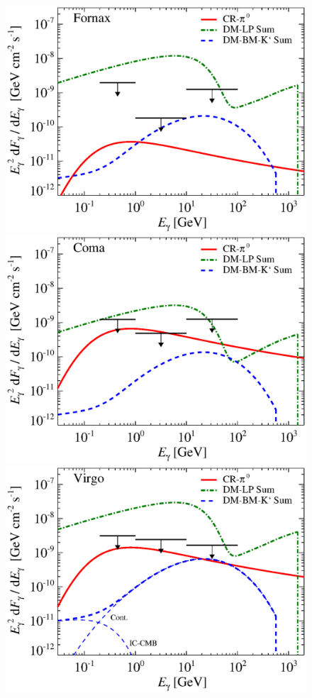 \documentclass[10pt,aps,pra,reprint,amsmath,amsfonts,amssymb,showpacs,nofootinbib,floatfix]{revtex4-1}
\def\del#1{{}}
\newcommand{\rmn}{\mathrm}
\newcommand{\sub}{\rmn{sub}}
\newcommand{\msun}{M_\odot}
\newcommand{\dd}{\rmn{d}}
\begin{document}
\del{Furthermore, the low mass clusters have a higher flux from IC
  upscattered SD photons than high mass clusters which increase the
  importance of the SD component in low mass clusters even more
  (c.f. Fig.~\ref{fig:IR_comp}).}


\del{
\begin{eqnarray}
L_{\gamma,\rmn{sub tot}} \propto N\,L_{\gamma,\sub} \propto N\,M_\sub 
 \propto M_\sub^{\left(A+1\right)}\,\frac{\dd N_\sub}{\dd M} \propto  M^{A-0.9}
\end{eqnarray}
Assuming that the concentration $c$ decrease for increasing mass as it
does for the mass range $10^{12}-10^{14}\,\msun$ where
$L_{\gamma,\sub} \propto N\,M_\sub^A$, where $A<1$.
}

\begin{figure}
\begin{minipage}{2.0\columnwidth}
 \includegraphics[width=0.49\columnwidth]{figures/flux.cluster.Fornax.v11.0.1deg.1.6T.SubMass.SF300.IR2.noMW.woGal.eps}
\includegraphics[width=0.49\columnwidth]{figures/flux.cluster.Coma.v11.0.1deg.1.6T.SubMass.SF300.IR2.noMW.woGal.eps}
\includegraphics[width=0.49\columnwidth]{figures/flux.cluster.Virgo.v11.0.1deg.1.6T.SubMass.SF300.IR2.noMW.woGal.eps}

\end{minipage}
\end{figure}
\end{document}
